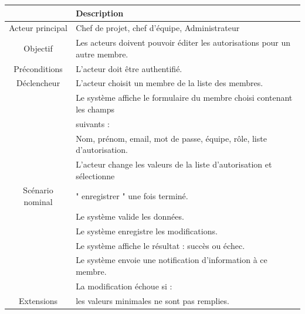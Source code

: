 \begin{center}
\begin{tabular}{|c|l|}
\hline 
&\textbf { Description }\\\hline 
    Acteur principal & Chef de projet, chef d’équipe, Administrateur \\\hline 
    Objectif&Les acteurs doivent pouvoir éditer les autorisations pour un autre membre.\\\hline
    Préconditions&L’acteur doit être authentifié.  \\\hline 
    Déclencheur&L’acteur choisit un membre de la liste des membres.\\\hline 
    &Le système affiche le formulaire du membre choisi contenant les champs     \\&suivants :\\
    &Nom, prénom, email, mot de passe, équipe, rôle, liste d’autorisation.   \\
    &L’acteur change les valeurs de la liste d'autorisation et sélectionne   \\
    Scénario nominal&" enregistrer " une fois terminé.   \\
    & Le système valide les données.    \\
    &Le système enregistre les modifications.   \\
    &Le système affiche le résultat : succès ou échec.\\
    &Le système envoie une notification d’information à ce membre.\\\hline
      &La modification échoue si :  \\
    Extensions&les valeurs minimales ne sont pas remplies.\\\hline             
\end{tabular}
\label{desc_edit_autor}
\end{center}
\newpage

